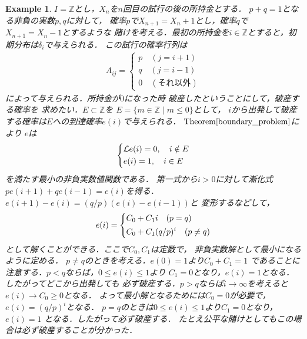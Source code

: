\documentclass[dvipdfmx,autodetect-engine]{jsarticle}
\newtheorem{example}{Example}[section]
\theoremstyle{remark}
\theoremstyle{definition}
\newcommand{\Z}{\mathbb{Z}}
\begin{document}
\begin{example}
    $I = \Z$とし，$X_n$を$n$回目の試行の後の所持金とする．
    $p+q=1$となる非負の実数$p,q$に対して，
    確率$p$で$X_{n+1}=X_{n}+1$とし，確率$q$で$X_{n+1}=X_{n}-1$とするような
    賭けを考える．最初の所持金を$i \in \Z$とすると，初期分布は$\delta_i$で与えられる．
    この試行の確率行列は
    \begin{align}
        A_{ij} = 
        \begin{cases}
            p \quad (j = i + 1) \\
            q \quad (j = i - 1)\\
            0 \quad (\text{それ以外}) 
        \end{cases}
    \end{align}
    によって与えられる．所持金が$0$になった時
    破産したということにして，破産する確率を
    求めたい．$E \subset \Z$を
    $E = \{m \in \Z \mid m \leq 0\}$として，
    $i$から出発して破産する確率は$E$への到達確率$e(i)$で与えられる．
    $\mathrm{Theorem}\ref{boundary_problem}$により
    $e$は
    \begin{align}
        \begin{dcases}
            \mathcal{L}e(i) = 0, \quad i \notin E \\
            e(i) = 1, \quad i \in E 
        \end{dcases}
    \end{align}
    を満たす最小の非負実数値関数である．
    第一式から$i>0$に対して漸化式
    $pe(i+1)+qe(i-1) = e(i)$を得る．
    $e(i+1)-e(i) = (q/p) (e(i) - e(i-1))$と
    変形するなどして，
    \begin{align}
        e(i) =
        \begin{dcases}
            C_0 + C_1 i \quad (p=q) \\
            C_0 + C_1 (q/p)^i \quad (p\neq q)
        \end{dcases}
    \end{align}
    として解くことができる．ここで$C_0,C_1$は定数で，
    非負実数解として最小になるように定める．
    $p \neq q$のときを考える．$e(0)=1$より$C_0 + C_1 = 1$
    であることに注意する．$p <q$ならば，$0 \leq e(i) \leq 1$より
    $C_1=0$となり，$e(i) = 1$となる．したがってどこから出発しても
    必ず破産する．$p > q$ならば$i \to \infty$を考えると
    $e(i) \to C_0 \geq 0$となる．
    よって最小解となるためには$C_0 = 0$が必要で，
    $e(i) = (q/p)^i$となる．
    $p=q$のときは$0 \leq e(i) \leq 1$より$C_1 = 0$となり，$e(i) = 1$
    となる．したがって必ず破産する．
    たとえ公平な賭けとしてもこの場合は必ず破産することが分かった．
\end{example}
\end{document}
